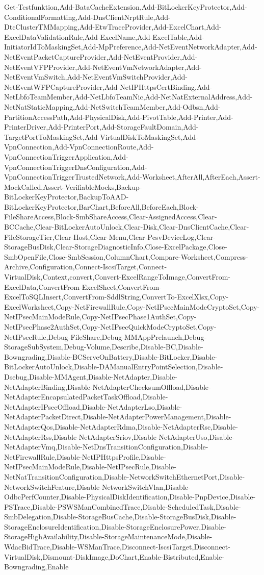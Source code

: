 {{		Get-Testfunktion,Add-BataCacheExtension,Add-BitLockerKeyProtector,Add-ConditionalFormatting,Add-DnsClientNrptRule,Add-DtcClusterTMMapping,Add-EtwTraceProvider,Add-ExcelChart,Add-ExcelDataValidationRule,Add-ExcelName,Add-ExcelTable,Add-InitiatorIdToMaskingSet,Add-MpPreference,Add-NetEventNetworkAdapter,Add-NetEventPacketCaptureProvider,Add-NetEventProvider,Add-NetEventVFPProvider,Add-NetEventVmNetworkAdapter,Add-NetEventVmSwitch,Add-NetEventVmSwitchProvider,Add-NetEventWFPCaptureProvider,Add-NetIPHttpsCertBinding,Add-NetLbfoTeamMember,Add-NetLbfoTeamNic,Add-NetNatExternalAddress,Add-NetNatStaticMapping,Add-NetSwitchTeamMember,Add-Odbsn,Add-PartitionAccessPath,Add-PhysicalDisk,Add-PivotTable,Add-Printer,Add-PrinterDriver,Add-PrinterPort,Add-StorageFaultDomain,Add-TargetPortToMaskingSet,Add-VirtualDiskToMaskingSet,Add-VpnConnection,Add-VpnConnectionRoute,Add-VpnConnectionTriggerApplication,Add-VpnConnectionTriggerDnsConfiguration,Add-VpnConnectionTriggerTrustedNetwork,Add-Worksheet,AfterAll,AfterEach,Assert-MockCalled,Assert-VerifiableMocks,Backup-BitLockerKeyProtector,BackupToAAD-BitLockerKeyProtector,BarChart,BeforeAll,BeforeEach,Block-FileShareAccess,Block-SmbShareAccess,Clear-AssignedAccess,Clear-BCCache,Clear-BitLockerAutoUnlock,Clear-Disk,Clear-DnsClientCache,Clear-FileStorageTier,Clear-Host,Clear-Menu,Clear-PcsvDeviceLog,Clear-StorageBusDisk,Clear-StorageDiagnosticInfo,Close-ExcelPackage,Close-SmbOpenFile,Close-SmbSession,ColumnChart,Compare-Worksheet,Compress-Archive,Configuration,Connect-IscsiTarget,Connect-VirtualDisk,Context,convert,Convert-ExcelRangeToImage,ConvertFrom-ExcelData,ConvertFrom-ExcelSheet,ConvertFrom-ExcelToSQLInsert,ConvertFrom-SddlString,ConvertTo-ExcelXlsx,Copy-ExcelWorksheet,Copy-NetFirewallRule,Copy-NetIPsecMainModeCryptoSet,Copy-NetIPsecMainModeRule,Copy-NetIPsecPhase1AuthSet,Copy-NetIPsecPhase2AuthSet,Copy-NetIPsecQuickModeCryptoSet,Copy-NetIPsecRule,Debug-FileShare,Debug-MMAppPrelaunch,Debug-StorageSubSystem,Debug-Volume,Describe,Disable-BC,Disable-Bowngrading,Disable-BCServeOnBattery,Disable-BitLocker,Disable-BitLockerAutoUnlock,Disable-DAManualEntryPointSelection,Disable-Dsebug,Disable-MMAgent,Disable-NetAdapter,Disable-NetAdapterBinding,Disable-NetAdapterChecksumOffload,Disable-NetAdapterEncapsulatedPacketTaskOffload,Disable-NetAdapterIPsecOffload,Disable-NetAdapterLso,Disable-NetAdapterPacketDirect,Disable-NetAdapterPowerManagement,Disable-NetAdapterQos,Disable-NetAdapterRdma,Disable-NetAdapterRsc,Disable-NetAdapterRss,Disable-NetAdapterSriov,Disable-NetAdapterUso,Disable-NetAdapterVmq,Disable-NetDnsTransitionConfiguration,Disable-NetFirewallRule,Disable-NetIPHttpsProfile,Disable-NetIPsecMainModeRule,Disable-NetIPsecRule,Disable-NetNatTransitionConfiguration,Disable-NetworkSwitchEthernetPort,Disable-NetworkSwitchFeature,Disable-NetworkSwitchVlan,Disable-OdbcPerfCounter,Disable-PhysicalDiskIdentification,Disable-PnpDevice,Disable-PSTrace,Disable-PSWSManCombinedTrace,Disable-ScheduledTask,Disable-SmbDelegation,Disable-StorageBusCache,Disable-StorageBusDisk,Disable-StorageEnclosureIdentification,Disable-StorageEnclosurePower,Disable-StorageHighAvailability,Disable-StorageMaintenanceMode,Disable-WdacBidTrace,Disable-WSManTrace,Disconnect-IscsiTarget,Disconnect-VirtualDisk,Dismount-DiskImage,DoChart,Enable-Bistributed,Enable-Bowngrading,Enable}}
